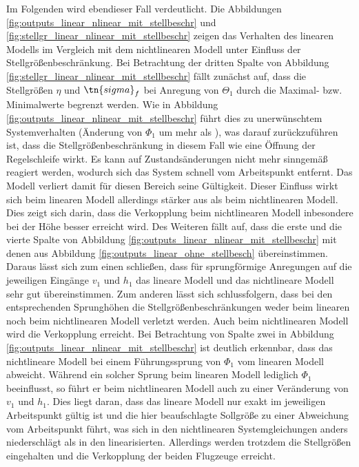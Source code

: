 Im Folgenden wird ebendieser Fall verdeutlicht. Die Abbildungen \ref{fig:outputs_linear_nlinear_mit_stellbeschr} und \ref{fig:stellgr_linear_nlinear_mit_stellbeschr} zeigen das Verhalten des linearen Modells im Vergleich mit dem nichtlinearen Modell unter Einfluss der Stellgrößenbeschränkung. Bei Betrachtung der dritten Spalte von Abbildung \ref{fig:stellgr_linear_nlinear_mit_stellbeschr} fällt zunächst auf, dass die Stellgrößen $\eta$ und $\tn{sigma}_f$ bei Anregung von $\Theta_1$ durch die Maximal- bzw. Minimalwerte begrenzt werden. Wie in Abbildung \ref{fig:outputs_linear_nlinear_mit_stellbeschr} führt dies zu unerwünschtem Systemverhalten (Änderung von $\Phi_1$ um mehr als ), was darauf zurückzuführen ist, dass die Stellgrößenbeschränkung in diesem Fall wie eine Öffnung der Regelschleife wirkt. Es kann auf Zustandsänderungen nicht mehr sinngemäß reagiert werden, wodurch sich das System schnell vom Arbeitspunkt entfernt. Das Modell verliert damit für diesen Bereich seine Gültigkeit. Dieser Einfluss wirkt sich beim linearen Modell allerdings stärker aus als beim nichtlinearen Modell. Dies zeigt sich darin, dass die Verkopplung beim nichtlinearen Modell inbesondere bei der Höhe besser erreicht wird. Des Weiteren fällt auf, dass die erste und die vierte Spalte von Abbildung \ref{fig:outputs_linear_nlinear_mit_stellbeschr} mit denen aus Abbildung \ref{fig:outputs_linear_ohne_stellbesch} übereinstimmen. Daraus lässt sich zum einen schließen, dass für sprungförmige Anregungen auf die jeweiligen Eingänge $v_1$ und $h_1$ das lineare Modell und das nichtlineare Modell sehr gut übereinstimmen. Zum anderen lässt sich schlussfolgern, dass bei den entsprechenden Sprunghöhen die Stellgrößenbeschränkungen weder beim linearen noch beim nichtlinearen Modell verletzt werden. Auch beim nichtlinearen Modell wird die Verkopplung erreicht. Bei Betrachtung von Spalte zwei in Abbildung \ref{fig:outputs_linear_nlinear_mit_stellbeschr} ist deutlich erkennbar, dass das nichtlineare Modell bei einem Führungssprung von $\Phi_1$ vom linearen Modell abweicht. Während ein solcher Sprung beim linearen Modell lediglich $\Phi_1$ beeinflusst, so führt er beim nichtlinearen Modell auch zu einer Veränderung von $v_1$ und $h_1$. Dies liegt daran, dass das lineare Modell nur exakt im jeweiligen Arbeitspunkt gültig ist und die hier beaufschlagte Sollgröße zu einer Abweichung vom Arbeitspunkt führt, was sich in den nichtlinearen Systemgleichungen anders niederschlägt als in den linearisierten. Allerdings werden trotzdem die Stellgrößen eingehalten und die Verkopplung der beiden Flugzeuge erreicht.

